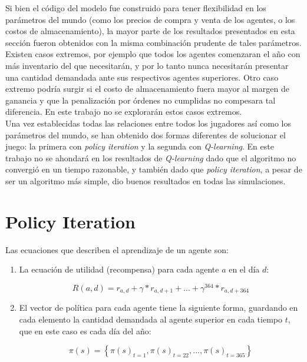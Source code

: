 Si bien el c\'odigo del modelo fue construido para tener flexibilidad en los par\'ametros del mundo (como los precios de compra y venta de los agentes, o los costos de almacenamiento), la mayor parte de los resultados presentados en esta secci\'on fueron obtenidos con la misma combinaci\'on prudente de tales par\'ametros. Existen casos extremos, por ejemplo que todos los agentes comenzaran el a\~no con m\'as inventario del que necesitar\'an, y por lo tanto nunca necesitar\'an presentar una cantidad demandada ante sus respectivos agentes superiores. Otro caso extremo podr\'ia surgir si el costo de almacenamiento fuera mayor al margen de ganancia y que la penalizaci\'on por \'ordenes no cumplidas no compesara tal diferencia. En este trabajo no se explorar\'an estos casos extremos.\\

Una vez establecidas todas las relaciones entre todos los jugadores as\'i como los par\'ametros del mundo, se han obtenido dos formas diferentes de solucionar el juego: la primera con \textit{policy iteration} y la segunda con \textit{Q-learning}. En este trabajo no se ahondar\'a en los resultados de \textit{Q-learning} dado que el algoritmo no convergi\'o en un tiempo razonable, y tambi\'en dado que \textit{policy iteration}, a pesar de ser un algoritmo m\'as simple, dio buenos resultados en todas las simulaciones.

\section{Policy Iteration}

Las ecuaciones que describen el aprendizaje de un agente son:

\begin{enumerate}
    \item La ecuaci\'on de utilidad (recompensa) para cada agente $a$ en el d\'ia $d$:

$$
R(a, d) = r_{a,d} + \gamma*r_{a, d+1} + ... + \gamma^{364}*r_{a,d+364}
$$

    \item El vector de pol\'itica para cada agente tiene la siguiente forma, guardando en cada elemento la cantidad demandada al agente superior en cada tiempo $t$, que en este caso es cada d\'ia del a\~no:
    
$$
\pi(s) = \left \{ \pi(s)_{ t = 1}, \pi(s)_{ t = 22}, ..., \pi(s)_{ t = 365} \right \}
$$

\end{enumerate}

